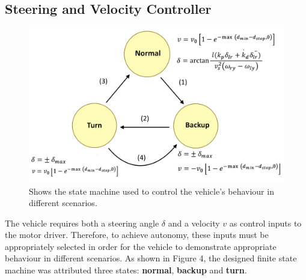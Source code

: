 \documentclass[conference]{IEEEtran}
\begin{document}



\subsection{Steering and Velocity Controller}

\begin{figure}
    \centering
    \includegraphics[scale=0.10]{state_machine.png}
    \caption{Shows the state machine used to control the vehicle's behaviour in different scenarios.}
\end{figure}




The vehicle requires both a steering angle $\delta$ and a velocity $v$ as control inputs to the motor driver. Therefore, to achieve autonomy, these inputs must be appropriately selected in order for the vehicle to demonstrate appropriate behaviour in different scenarios. As shown in Figure 4, the designed finite state machine was attributed three states: \textbf{normal}, \textbf{backup} and \textbf{turn}. 
\end{document}
